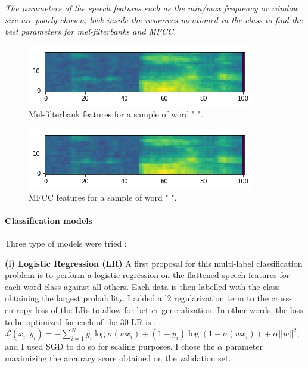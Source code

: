 \documentclass[11pt]{article}
\begin{document}

\textit{The parameters of the speech features such as the min/max frequency or window size are poorly chosen, look inside the resources mentioned in the class to find the best parameters for mel-filterbanks and MFCC.}

\begin{figure}[h!]
\begin{center}
\includegraphics[scale=0.5]{i.png}
\caption{Mel-filterbank features for a sample of word " ".}
\end{center}
\end{figure}

\begin{figure}[h!]
\begin{center}
\includegraphics[scale=0.5]{i.png}
\caption{MFCC features for a sample of word " ".}
\end{center}
\end{figure}


\paragraph{Classification models} Three type of models were tried : 

\textbf{(i) Logistic Regression (LR)} A first proposal for this multi-label classification problem is to perform a logistic regression on the flattened speech features for each word class against all others. Each data is then labelled with the class obtaining the largest probability. I added a l2 regularization term to the cross-entropy loss of the LRs to allow for better generalization. In other words, the loss to be optimized for each of the $30$ LR is : $\mathcal{L}(x_i,y_i) = - \sum_{i=1}^N y_i \log \sigma(w x_i) + (1-y_i) \log (1-\sigma(w x_i)) + \alpha ||w||^2$, and I used SGD to do so for scaling purposes. I chose the $\alpha$ parameter maximizing the accuracy score obtained on the validation set.
\end{document}
